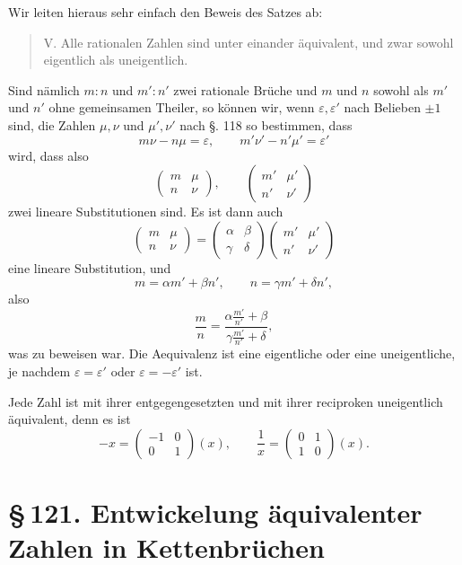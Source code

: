 \documentclass[11pt]{article}
\providecommand{\sect}[2]{\section*{\S\,#1. #2}}
\begin{document}
Wir leiten hieraus sehr einfach den Beweis des Satzes ab:
\begin{quote}
V. Alle rationalen Zahlen sind unter einander äquivalent, und zwar sowohl eigentlich als uneigentlich.
\end{quote}

Sind nämlich $m:n$ und $m':n'$ zwei rationale Brüche und $m$ und $n$ sowohl als $m'$ und $n'$ ohne gemeinsamen Theiler, so können wir, wenn $\varepsilon,\varepsilon'$ nach Belieben $\pm1$ sind, die Zahlen $\mu,\nu$ und $\mu',\nu'$ nach §. 118 so bestimmen, dass
\[
        m\nu-n\mu=\varepsilon,
        \qquad
        m'\nu'-n'\mu'=\varepsilon'
\]
wird, dass also
\[
        \begin{pmatrix}m&\mu\\ n&\nu\end{pmatrix},
        \qquad
        \begin{pmatrix}m'&\mu'\\ n'&\nu'\end{pmatrix}
\]
zwei lineare Substitutionen sind. Es ist dann auch
\[
        \begin{pmatrix}m&\mu\\ n&\nu\end{pmatrix}
        =\begin{pmatrix}\alpha&\beta\\ \gamma&\delta\end{pmatrix}
         \begin{pmatrix}m'&\mu'\\ n'&\nu'\end{pmatrix}
\]
eine lineare Substitution, und
\[
        m=\alpha m'+\beta n',
        \qquad
        n=\gamma m'+\delta n',
\]
also
\[
        \frac mn=\frac{\alpha\frac{m'}{n'}+\beta}{\gamma\frac{m'}{n'}+\delta},
\]
was zu beweisen war. Die Aequivalenz ist eine eigentliche oder eine uneigentliche, je nachdem $\varepsilon=\varepsilon'$ oder $\varepsilon=-\varepsilon'$ ist.

Jede Zahl ist mit ihrer entgegengesetzten und mit ihrer reciproken uneigentlich äquivalent, denn es ist
\[
        -x=\begin{pmatrix}-1&0\\0&1\end{pmatrix}(x),
        \qquad
        \frac1x=\begin{pmatrix}0&1\\1&0\end{pmatrix}(x).
\]

\sect{121}{Entwickelung äquivalenter Zahlen in Kettenbrüchen}
\end{document}

